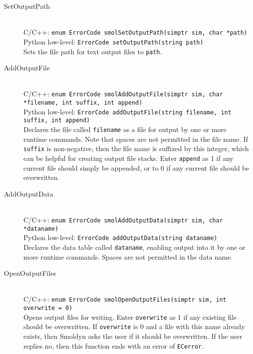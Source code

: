 \documentclass {book}
\newcommand {\ttt} {\texttt}
\begin{document}
\begin{description}

\item[SetOutputPath]
\hfill \\
C/C++: \ttt{enum ErrorCode smolSetOutputPath(simptr sim, char *path)}\\
Python low-level: \ttt{ErrorCode setOutputPath(string path)}\\
Sets the file path for text output files to \ttt{path}.

\item[AddOutputFile]
\hfill \\
C/C++: \ttt{enum ErrorCode smolAddOutputFile(simptr sim, char *filename, int suffix, int append)}\\
Python low-level: \ttt{ErrorCode addOutputFile(string filename, int suffix, int append)}\\
Declares the file called \ttt{filename} as a file for output by one or more runtime commands. Note that spaces are not permitted in the file name. If \ttt{suffix} is non-negative, then the file name is suffixed by this integer, which can be helpful for creating output file stacks. Enter \ttt{append} as 1 if any current file should simply be appended, or to 0 if any current file should be overwritten.

\item[AddOutputData]
\hfill \\
C/C++: \ttt{enum ErrorCode smolAddOutputData(simptr sim, char *dataname)}\\
Python low-level: \ttt{ErrorCode addOutputData(string dataname)}\\
Declares the data table called \ttt{dataname}, enabling output into it by one or more runtime commands. Spaces are not permitted in the data name.

\item[OpenOutputFiles]
\hfill \\
C/C++: \ttt{enum ErrorCode smolOpenOutputFiles(simptr sim, int overwrite = 0)}\\
Opens output files for writing. Enter \ttt{overwrite} as 1 if any existing file should be overwritten. If \ttt{overwrite} is 0 and a file with this name already exists, then Smoldyn asks the user if it should be overwritten. If the user replies no, then this function ends with an error of \ttt{ECerror}.


\end{description}
\end{document}
